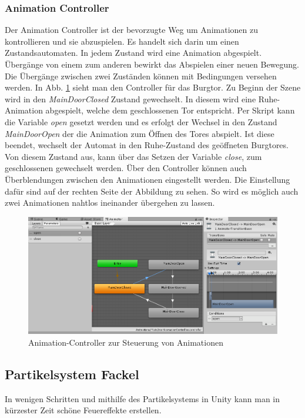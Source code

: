 \subsubsection{Animation Controller}

Der Animation Controller ist der bevorzugte Weg um Animationen zu kontrollieren und sie abzuspielen. Es handelt sich darin um einen Zustandsautomaten. In jedem Zustand wird eine Animation abgespielt. Übergänge von einem zum anderen bewirkt das Abspielen einer neuen Bewegung. Die Übergänge zwischen zwei Zuständen können mit Bedingungen versehen werden. In Abb. \ref{fig:animController} sieht man den Controller für das Burgtor. Zu Beginn der Szene wird in den \textit{MainDoorClosed} Zustand gewechselt. In diesem wird eine Ruhe-Animation abgespielt, welche dem geschlossenen Tor entspricht. Per Skript kann die Variable \textit{open} gesetzt werden und es erfolgt der Wechsel in den Zustand \textit{MainDoorOpen} der die Animation zum Öffnen des Tores abspielt. Ist diese beendet, wechselt der Automat in den Ruhe-Zustand des geöffneten Burgtores. Von diesem Zustand aus, kann über das Setzen der Variable \textit{close}, zum geschlossenen gewechselt werden. Über den Controller können auch Überblendungen zwischen den Animationen eingestellt werden. Die Einstellung dafür sind auf der rechten Seite der Abbildung zu sehen. So wird es möglich auch zwei Animationen nahtlos ineinander übergehen zu lassen. 


\begin{figure}[h]
	\centering
	\includegraphics[width=0.95\linewidth]{Abbildungen/Unity/AnimationController}
	\caption{Animation-Controller zur Steuerung von Animationen}
	\label{fig:animController}
\end{figure}

\newpage
\subsection{Partikelsystem Fackel}
In wenigen Schritten und mithilfe des Partikelsystems in Unity kann man in kürzester Zeit schöne Feuereffekte erstellen.

